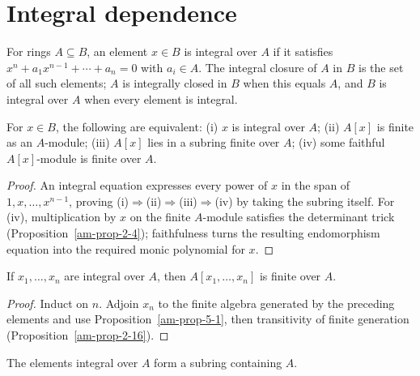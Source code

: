 \section{Integral dependence}
\label{am-ch5-integral}
\begin{definition}
\label{am-def-integral}
\uses{}
For rings $A\subseteq B$, an element $x\in B$ is integral over $A$ if it satisfies
$x^n+a_1x^{n-1}+\cdots+a_n=0$ with $a_i\in A$.  The integral closure of $A$
in $B$ is the set of all such elements; $A$ is integrally closed in $B$ when
this equals $A$, and $B$ is integral over $A$ when every element is integral.
\end{definition}
\begin{proposition}
\label{am-prop-5-1}
\uses{}
For $x\in B$, the following are equivalent: (i) $x$ is integral over $A$;
(ii) $A[x]$ is finite as an $A$-module; (iii) $A[x]$ lies in a subring finite
over $A$; (iv) some faithful $A[x]$-module is finite over $A$.
\end{proposition}
\begin{proof}
An integral equation expresses every power of $x$ in the span of
$1,x,\ldots,x^{n-1}$, proving (i)$\Rightarrow$(ii)$\Rightarrow$(iii)$\Rightarrow$(iv)
by taking the subring itself.  For (iv), multiplication by $x$ on the finite
$A$-module satisfies the determinant trick (Proposition~\ref{am-prop-2-4});
faithfulness turns the resulting endomorphism equation into the required
monic polynomial for $x$.
\end{proof}
\begin{corollary}
\label{am-cor-5-2}
\uses{}
If $x_1,\ldots,x_n$ are integral over $A$, then $A[x_1,\ldots,x_n]$ is finite
over $A$.
\end{corollary}
\begin{proof}
Induct on $n$.  Adjoin $x_n$ to the finite algebra generated by the preceding
elements and use Proposition~\ref{am-prop-5-1}, then transitivity of finite
generation (Proposition~\ref{am-prop-2-16}).
\end{proof}
\begin{corollary}
\label{am-cor-5-3}
\uses{}
The elements integral over $A$ form a subring containing $A$.
\end{corollary}
